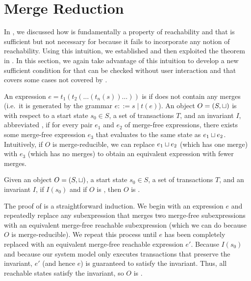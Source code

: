 \section{Merge Reduction}
In , we discussed how \invariantconfluence{} is
fundamentally a property of reachability and that \invariantclosure{} is
sufficient but not necessary for \invariantconfluence{} because it fails to
incorporate any notion of reachability. Using this intuition, we established
 and then exploited the theorem in
. In this section, we again take
advantage of this intuition to develop a new sufficient condition for
\invariantconfluence{} that can be checked without user interaction and that
covers some cases not covered by \invariantclosure{}.

An expression $e = t_1(t_2(\ldots(t_n(s))\ldots))$ is  if
does not contain any merges (i.e.\ it is generated by the grammar $e ::= s \mid
t(e)$). An object $O = (S, \sqcup)$ is  with respect to
a start state $s_0 \in S$, a set of transactions $T$, and an invariant $I$,
abbreviated , if for every pair $e_1$ and $e_2$ of
merge-free \sTIreachable{} expressions, there exists some merge-free
\sTIreachable{} expression $e_3$ that evaluates to the same state as $e_1 \sqcup
e_2$. Intuitively, if $O$ is merge-reducible, we can replace $e_1 \sqcup e_2$
(which has one merge) with $e_3$ (which has no merges) to obtain an equivalent
expression with fewer merges.

\begin{theorem}
  Given an object $O = (S, \sqcup)$, a start state $s_0 \in S$, a set of
  transactions $T$, and an invariant $I$, if $I(s_0)$ and if $O$ is
  \sTImergereducible{}, then $O$ is \sTIconfluent{}.
\end{theorem}

The proof of  is a straightforward
induction. We begin with an \sTIreachable{} expression $e$ and repeatedly
replace any subexpression that merges two merge-free subexpressions with an
equivalent merge-free reachable subexpression (which we can do because $O$ is
merge-reducible). We repeat this process until $e$ has been completely replaced
with an equivalent merge-free reachable expression $e'$. Because $I(s_0)$ and
because our system model only executes transactions that preserve the
invariant, $e'$ (and hence $e$) is guaranteed to satisfy the invariant. Thus,
all reachable states satisfy the invariant, so $O$ is \invariantconfluent{}.

